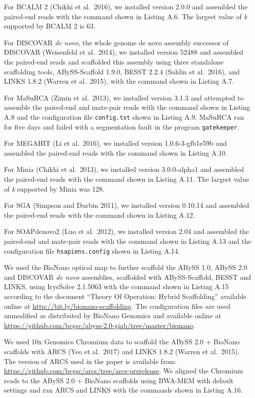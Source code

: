 \documentclass[
  12pt,
  oneside,
  openany]{book}
\begin{document}
\begin{appendices}
For BCALM 2 (Chikhi et al.~2016), we installed version 2.0.0 and assembled the paired-end reads with the command shown in Listing A.6. The largest value of \emph{k} supported by BCALM 2 is 63.

For DISCOVAR \emph{de novo}, the whole genome de novo assembly successor of DISCOVAR (Weisenfeld et al.~2014), we installed version 52488 and assembled the paired-end reads and scaffolded this assembly using three standalone scaffolding tools, ABySS-Scaffold 1.9.0, BESST 2.2.4 (Sahlin et al.~2016), and LINKS 1.8.2 (Warren et al.~2015), with the command shown in Listing A.7.

For MaSuRCA (Zimin et al.~2013), we installed version 3.1.3 and attempted to assemble the paired-end and mate-pair reads with the command shown in Listing A.8 and the configuration file \texttt{config.txt} shown in Listing A.9. MaSuRCA ran for five days and failed with a segmentation fault in the program \texttt{gatekeeper}.

For MEGAHIT (Li et al.~2016), we installed version 1.0.6-3-gfb1e59b and assembled the paired-end reads with the command shown in Listing A.10.

For Minia (Chikhi et al.~2013), we installed version 3.0.0-alpha1 and assembled the paired-end reads with the command shown in Listing A.11. The largest value of \emph{k} supported by Minia was 128.

For SGA (Simpson and Durbin 2011), we installed version 0.10.14 and assembled the paired-end reads with the command shown in Listing A.12.

For SOAPdenovo2 (Luo et al.~2012), we installed version 2.04 and assembled the paired-end and mate-pair reads with the command shown in Listing A.13 and the configuration file \texttt{hsapiens.config} shown in Listing A.14.

We used the BioNano optical map to further scaffold the ABySS 1.0, ABySS 2.0 and DISCOVAR \emph{de novo} assemblies, scaffolded with ABySS-Scaffold, BESST and LINKS, using IrysSolve 2.1.5063 with the command shown in Listing A.15 according to the document ``Theory Of Operation: Hybrid Scaffolding'' available online at \url{http://bit.ly/bionano-scaffolding}. The configuration files are used unmodified as distributed by BioNano Genomics and available online at \url{https://github.com/bcgsc/abyss-2.0-giab/tree/master/bionano}.

We used 10x Genomics Chromium data to scaffold the ABySS 2.0 + BioNano scaffolds with ARCS (Yeo et al.~2017) and LINKS 1.8.2 (Warren et al.~2015). The version of ARCS used in the paper is available from: \url{https://github.com/bcgsc/arcs/tree/arcs-prerelease}. We aligned the Chromium reads to the ABySS 2.0 + BioNano scaffolds using BWA-MEM with default settings and ran ARCS and LINKS with the commands shown in Listing A.16.


\end{appendices}
\end{document}
